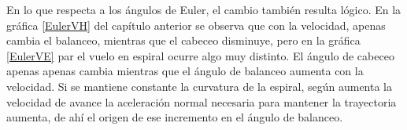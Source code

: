 En lo que respecta a los ángulos de Euler, el cambio también resulta lógico. En la gráfica \ref{EulerVH} del capítulo anterior se observa que con la velocidad, apenas cambia el balanceo, mientras que el cabeceo disminuye, pero en la gráfica \ref{EulerVE} par el vuelo en espiral ocurre algo muy distinto.
El ángulo de cabeceo apenas apenas cambia mientras que el ángulo de balanceo aumenta con la velocidad. Si se mantiene constante la curvatura de la espiral, según aumenta la velocidad de avance la aceleración normal necesaria para mantener la trayectoria aumenta, de ahí el origen de ese incremento en el ángulo de balanceo.

